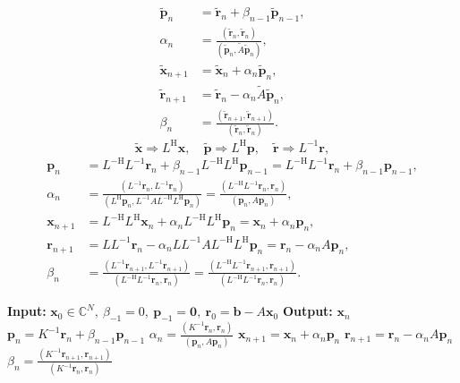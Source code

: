 \[\begin{aligned}
\widetilde{\bm p}_n&=\widetilde{\bm r}_n+\beta_{n-1}\widetilde{\bm p}_{n-1},\\
\alpha_n&=\frac{(\widetilde{\bm r}_n,\widetilde{\bm r}_n)}{(\widetilde{\bm p}_n,\widetilde A\widetilde{\bm p}_n)},\\
\widetilde{\bm x}_{n+1}&=\widetilde{\bm x}_n+\alpha_n\widetilde{\bm p}_n,\\
\widetilde{\bm r}_{n+1}&=\widetilde{\bm r}_n-\alpha_n\widetilde A\widetilde{\bm p}_n,\\
\beta_n&=\frac{(\widetilde{\bm r}_{n+1},\widetilde{\bm r}_{n+1})}{(\widetilde{\bm r}_n,\widetilde{\bm r}_n)}.
\end{aligned}\]
\[\widetilde{\bm x}\Rightarrow L^{\mathrm H}\bm x,\quad\widetilde{\bm p}\Rightarrow L^{\mathrm H}\bm p,\quad\widetilde{\bm r}\Rightarrow L^{-1}\bm r,\]
\[\begin{aligned}
\bm p_n&=L^{-\mathrm H}L^{-1}\bm r_n+\beta_{n-1}L^{-\mathrm H}L^{\mathrm H}\bm p_{n-1}=L^{-\mathrm H}L^{-1}\bm r_n+\beta_{n-1}\bm p_{n-1},\\
\alpha_n&=\frac{(L^{-1}\bm r_n,L^{-1}\bm r_n)}{(L^{\mathrm H}\bm p_n,L^{-1}AL^{-\mathrm H}L^{\mathrm H}\bm p_n)}=\frac{(L^{-\mathrm H}L^{-1}\bm r_n,\bm r_n)}{(\bm p_n,A\bm p_n)},\\
\bm x_{n+1}&=L^{-\mathrm H}L^{\mathrm H}\bm x_n+\alpha_nL^{-\mathrm H}L^{\mathrm H}\bm p_n=\bm x_n+\alpha_n\bm p_n,\\
\bm r_{n+1}&=LL^{-1}\bm r_n-\alpha_nLL^{-1}AL^{-\mathrm H}L^{\mathrm H}\bm p_n=\bm r_n-\alpha_nA\bm p_n,\\
\beta_n&=\frac{(L^{-1}\bm r_{n+1},L^{-1}\bm r_{n+1})}{(L^{-\mathrm H}L^{-1}\bm r_n,\bm r_n)}=\frac{(L^{-\mathrm H}L^{-1}\bm r_{n+1},\bm r_{n+1})}{(L^{-\mathrm H}L^{-1}\bm r_n,\bm r_n)}.
\end{aligned}\]
\begin{algorithm}[H]\caption{}\label{alg:pcg}
\begin{algorithmic}[1]
\Statex\textbf{Input:} $\bm x_0\in\mathbb C^N,\ \beta_{-1}=0,\ \bm p_{-1}=\bm0,\ \bm r_0=\bm b-A\bm x_0$
\Statex\textbf{Output:} $\bm x_n$
\State $\bm p_n=K^{-1}\bm r_n+\beta_{n-1}\bm p_{n-1}$
\State $\alpha_n=\frac{(K^{-1}\bm r_n,\bm r_n)}{(\bm p_n,A\bm p_n)}$
\State $\bm x_{n+1}=\bm x_n+\alpha_n\bm p_n$
\State $\bm r_{n+1}=\bm r_n-\alpha_nA\bm p_n$
\State $\beta_n=\frac{(K^{-1}\bm r_{n+1},\bm r_{n+1})}{(K^{-1}\bm r_n,\bm r_n)}$
\EndFor\end{algorithmic}\end{algorithm}
